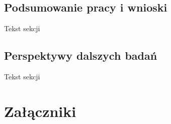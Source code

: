 \documentclass[licencjacka]{pracamgr}
\begin{document}
\section{Podsumowanie pracy i wnioski}
Tekst sekcji
\section{Perspektywy dalszych badań}
Tekst sekcji

\begin{thebibliography}{99}













\end{thebibliography}

\chapter*{Załączniki}
\end{document}
